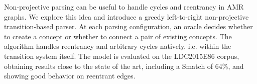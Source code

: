 Non-projective parsing can be useful to handle cycles and reentrancy in AMR graphs. We explore this idea and introduce a greedy left-to-right non-projective transition-based parser. At each parsing configuration, an oracle decides whether to create a concept or whether to connect a pair of existing concepts. The algorithm handles reentrancy and arbitrary cycles natively, i.e. within the transition system itself. The model is evaluated on the LDC2015E86 corpus, obtaining results close to the state of the art, including a Smatch of 64\%, and showing good behavior on reentrant edges.
